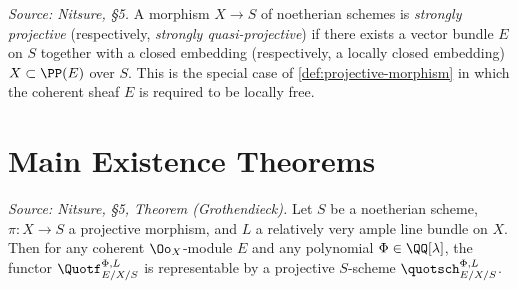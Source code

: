 \begin{definition}
  \label{def:strongly-projective}
  \textit{Source: Nitsure, §5.}
  A morphism $X \to S$ of noetherian schemes is \emph{strongly projective}
  (respectively, \emph{strongly quasi-projective}) if there exists a vector
  bundle $E$ on $S$ together with a closed embedding (respectively, a locally
  closed embedding) $X \subset \PP(E)$ over $S$. This is the special case of
  \cref{def:projective-morphism} in which the coherent sheaf $E$ is required to
  be locally free.
\end{definition}

\bigskip
\section*{Main Existence Theorems}
\medskip

\begin{theorem}
  \label{thm:grothendieck-quot}
  \textit{Source: Nitsure, §5, Theorem (Grothendieck).}
  Let $S$ be a noetherian scheme, $\pi : X \to S$ a projective morphism, and
  $L$ a relatively very ample line bundle on $X$. Then for any coherent
  $\Oo_X$-module $E$ and any polynomial $\Phi \in \QQ[\lambda]$, the functor
  $\Quotf_{E/X/S}^{\Phi,L}$ is representable by a projective $S$-scheme
  $\quotsch_{E/X/S}^{\Phi,L}$.
\end{theorem}

